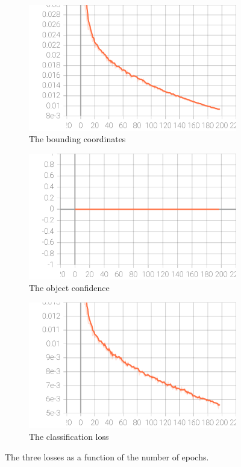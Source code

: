 \documentclass[10pt,conference,compsocconf]{IEEEtran}
\begin{document}
\begin{appendices}
\begin{figure}[!ht]
  \centering
  \begin{subfigure}{0.27\textwidth}
    \includegraphics[width=\linewidth]{Image/train_box_loss.pdf}
    \caption{The bounding coordinates}
  \end{subfigure}
  \hfil
  \begin{subfigure}{0.27\textwidth}
    \includegraphics[width=\linewidth]{Image/train_cls_loss.pdf}
    \caption{The object confidence}
  \end{subfigure}
  \hfil
  \begin{subfigure}{0.27\textwidth}
    \includegraphics[width=\linewidth]{Image/train_obj_loss.pdf}
    \caption{The classification loss}
  \end{subfigure}
  \caption{The three losses as a function of the number of epochs.}
\end{figure}


\end{appendices}
\end{document}
